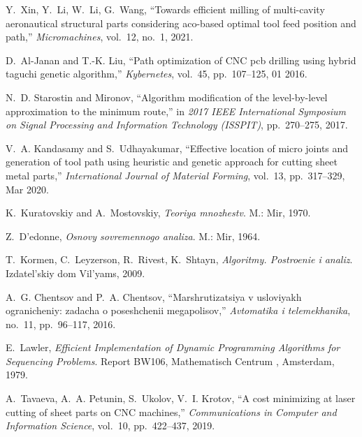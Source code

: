   \item
  Y.~Xin, Y.~Li, W.~Li, G.~Wang, ``Towards efficient milling of multi-cavity
    aeronautical structural parts considering aco-based optimal tool feed
    position and path,'' {\em Micromachines}, vol.~12, no.~1, 2021.

  \item
  D.~Al-Janan and T.-K. Liu, ``Path optimization of {CNC} pcb drilling using
    hybrid taguchi genetic algorithm,'' {\em Kybernetes}, vol.~45, pp.~107--125,
    01 2016.

  \item
  N.~D. Starostin and Mironov, ``Algorithm modification of the level-by-level
    approximation to the minimum route,'' in {\em 2017 IEEE International
    Symposium on Signal Processing and Information Technology (ISSPIT)},
    pp.~270--275, 2017.

  \item
  V.~A. Kandasamy and S.~Udhayakumar, ``{Effective location of micro joints and
    generation of tool path using heuristic and genetic approach for cutting
    sheet metal parts},'' {\em International Journal of Material Forming},
    vol.~13, pp.~317--329, Mar 2020.

  \item
  K.~Kuratovskiy and A.~Mostovskiy, {\em Teoriya mnozhestv}.
  \newblock M.: Mir, 1970.

  \item
  Z.~D'edonne, {\em Osnovy sovremennogo analiza}.
  \newblock M.: Mir, 1964.

  \item
  T.~Kormen, C.~Leyzerson, R.~Rivest, K.~Shtayn, {\em Algoritmy. Postroenie i
    analiz}.
  \newblock Izdatel'skiy dom Vil'yams, 2009.

  \item
  A.~G. Chentsov and P.~A. Chentsov, ``Marshrutizatsiya v usloviyakh
    ogranicheniy: zadacha o poseshchenii megapolisov,'' {\em Avtomatika i
    telemekhanika}, no.~11, pp.~96--117, 2016.

  \item
  E.~Lawler, {\em Efficient Implementation of Dynamic Programming Algorithms for
    Sequencing Problems}.
  \newblock Report BW106, Mathematisch Centrum , Amsterdam, 1979.

  \item
  A.~Tavaeva, A.~A. Petunin, S.~Ukolov, V.~I. Krotov, ``A cost minimizing at
    laser cutting of sheet parts on {{CNC}} machines,'' {\em Communications in
    Computer and Information Science}, vol.~10, pp.~422--437, 2019.
